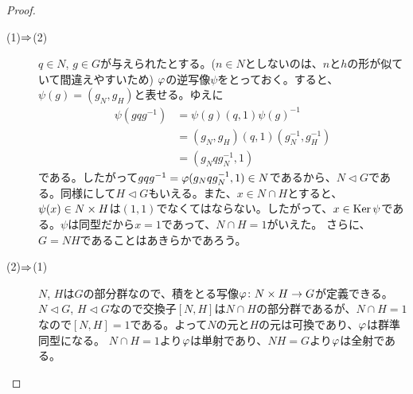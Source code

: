 \begin{proof} ${}$
  \begin{description}
    \item[(1)$\Rightarrow$(2)] $q \in N$, $g \in G$が与えられたとする。($n \in N$としないのは、$n$と$h$の形が似ていて間違えやすいため) ${\varphi}$の逆写像$\psi$をとっておく。すると、$\psi(g) = (g_N, g_H)$と表せる。ゆえに
    \begin{align*}
      \psi(gqg^{-1}) &= \psi(g) (q,1) \psi(g)^{-1} \\
      &= (g_N,g_H) (q,1) (g_N^{-1}, g_H^{-1}) \\
      &= ( g_N q g_N^{-1} , 1)
    \end{align*}
    である。したがって$gqg^{-1} = {\varphi}(g_N q g_N^{-1} , 1) \in N$であるから、$N \lhd G$である。同様にして$H \lhd G$もいえる。また、$x \in N \cap H$とすると、$\psi(x) \in N \times H$は$(1,1)$でなくてはならない。したがって、$x \in \operatorname{Ker} \psi$である。$\psi$は同型だから$x=1$であって、$N \cap H =1$がいえた。
    さらに、$G = NH$であることはあきらかであろう。
    \item[(2)$\Rightarrow$(1)] $N$, $H$は$G$の部分群なので、積をとる写像${\varphi} \colon N \times H \to G$が定義できる。$N \lhd G$, $H \lhd G$なので交換子$[N,H]$は$N \cap H$の部分群であるが、$N \cap H = 1$なので$[N,H] = 1$である。よって$N$の元と$H$の元は可換であり、${\varphi}$は群準同型になる。
    $N \cap H = 1$より${\varphi}$は単射であり、$NH=G$より${\varphi}$は全射である。
  \end{description}
\end{proof}


